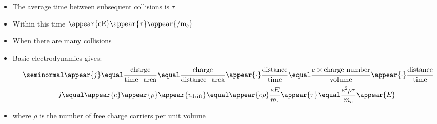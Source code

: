 \begin{frame}
\frametitle{\texorpdfstring{\culine[\sectiontitleulinecolor]{\sectiontitle}}{\sectiontitle} }

\begin{itemize}
	\item The average time between subsequent collisions is $\tau$
	\item Within this time $\appear{\mathrm{e} \mathrm{E}}  \appear{\tau} \appear{/ \mathrm{m}_{\mathrm{e}}}$

\item When there are many collisions 

\item Basic electrodynamics gives:
$$ \seminormal
\appear{j} \equal \frac{\text {charge}}{\text{time} \cdot \text{area}} \equal \frac{\text{charge}}{\text {distance} \cdot \text{area}} \appear{\cdot} \frac{\text{distance}}{\text {time}}
 \equal \frac{e \times \text {charge number}}{\text {volume}} \appear{\cdot} \frac{\text{distance}}{\text {time}}
$$
\[
 j \equal \appear{e} \appear{\rho} \appear{v_{\text {drift}}}  \equal \appear{e \rho} \frac{e E}{m_{e}} \appear{\tau}  \equal \frac{e^{2} \rho \tau}{m_{e}} \appear{E}
\]
\item[] where $\rho$ is the number of free charge carriers per unit volume
\end{itemize}

\endofslide 
\end{frame}

